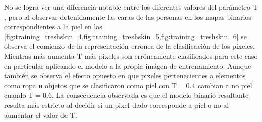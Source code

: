 No se logra ver una diferencia notable entre los diferentes valores del parámetro $\text{T}$, pero al observar detenidamente las caras de las personas en los mapas binarios correspondientes a la piel en las \cref{fig:training_treshskin_4,fig:training_treshskin_5,fig:training_treshskin_6} se observa el comienzo de la representación erronea de la clasificación de los pixeles. Mientras más aumenta $\text{T}$ más pixeles son erróneamente clasificados para este caso en particular aplicando el modelo a la propia imágen de entrenamiento. Aunque también se observa el efecto opuesto en que pixeles pertenecientes a elementos como ropa u objetos que se clasificaron como piel con $\text{T}=0.4$ cambian a no piel cuando $\text{T}=0.6$. La consecuencia observada es que el modelo binario resultante resulta más estricto al decidir si un pixel dado corresponde a piel o no al aumentar el valor de $\text{T}$.
